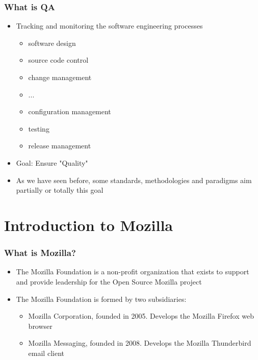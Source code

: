\documentclass{beamer}
\begin{document}
\begin{frame}
\frametitle{What is QA}
\begin{itemize}
\item Tracking and monitoring the software engineering processes
    \begin{itemize}
       \item software design 
       \item source code control 
       \item change management 
       \item ...
       \item configuration management 
       \item testing 
       \item release management
    \end{itemize}
\item Goal: Ensure "Quality"
\item As we have seen before, some standards, methodologies and paradigms aim partially or totally this goal
\end{itemize}
\end{frame}


\section{Introduction to Mozilla}


\begin{frame}
\frametitle{What is Mozilla?}
 \begin{itemize}
 \item The Mozilla Foundation is a non-profit organization that exists to support and provide leadership for the Open Source Mozilla project
 \item The Mozilla Foundation is formed by two subsidiaries:
     \begin{itemize}
     \item Mozilla Corporation, founded in 2005. Develops the Mozilla Firefox web browser
     \item Mozilla Messaging, founded in 2008. Develops the Mozilla Thunderbird email client
     \end{itemize}

 \end{itemize}
\end{frame}
\end{document}
